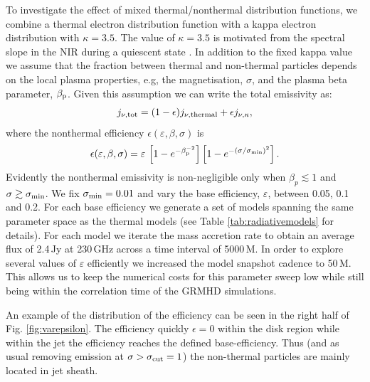 To investigate the effect of mixed thermal/nonthermal distribution functions, we combine a thermal electron distribution function with a kappa electron distribution with $\kappa=3.5$. The value of $\kappa=3.5$ is motivated from the spectral slope in the NIR during a quiescent state  .  In addition to the fixed kappa value we assume that the fraction between thermal and non-thermal particles depends on the local plasma properties, e.g, the magnetisation, $\sigma$, and the plasma beta parameter, $\beta_{\rm p}$. Given this assumption we can write the total emissivity as:
\begin{equation}
j_{\nu,\rm{tot}}=(1-\epsilon) j_{\nu,\rm{thermal}} + \epsilon j_{\nu, \kappa},
\label{eq:kappaeff}
\end{equation}
where the nonthermal efficiency $\epsilon( \varepsilon, \beta, \sigma)$ is
\begin{equation}
    \epsilon(\varepsilon,\beta,\sigma)=\varepsilon\,
    \left[1 - e^{-\beta_{\rm p}^{-2}}\right]
    \left[1-e^{-(\sigma/\sigma_{\rm min})^2}\right].
    \label{eq:efficiencybetasigma}
\end{equation}
Evidently the nonthermal emissivity is non-negligible only when $\beta_p \lesssim 1$ and $\sigma \gtrsim \sigma_{\rm min}$.  We fix $\sigma_{\rm min}=0.01$ and vary the base efficiency, $\varepsilon$, between 0.05, 0.1 and 0.2. For each base efficiency we generate a set of models spanning the same parameter space as the thermal models (see Table \ref{tab:radiativemodels} for details). For each model we iterate the mass accretion rate to obtain an average flux of 2.4\,Jy at 230\,GHz across a time interval of 5000\,M. In order to explore several values of $\varepsilon$ efficiently we increased the model snapshot cadence to 50\,M. This allows us to keep the numerical costs for this parameter sweep low while still being within the correlation time of the GRMHD simulations.

An example of the distribution of the efficiency can be seen in the right half of  Fig. \ref{fig:varepsilon}. The efficiency quickly $\epsilon=0$ within the disk region while within the jet the efficiency reaches the defined base-efficiency. Thus (and as usual removing emission at $\sigma > \sigma_{\rm cut}=1$) the non-thermal particles are mainly located in jet sheath.

